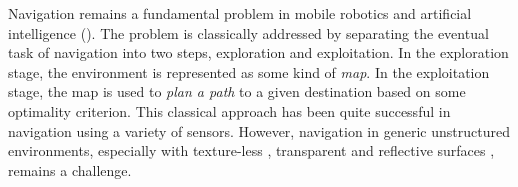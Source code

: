 
Navigation remains a fundamental problem in mobile robotics and artificial intelligence (\cite{SmChIJRR1986,ElCOMPUTER1980}).
The problem is classically addressed by separating the eventual task of navigation into two steps, exploration and exploitation. 
In the exploration stage, the environment is represented as some kind of \emph{map}. 
In the exploitation stage, the map is used to \emph{plan a path} to a given destination based on some optimality criterion. 
This classical approach has been quite successful in navigation using a variety of sensors.
However, navigation in generic unstructured environments, especially with texture-less \cite{YaSoKaIROS2016}, transparent and reflective surfaces \cite{lai2011large}, remains a challenge.


